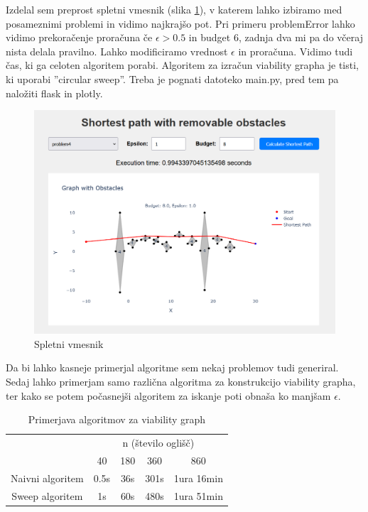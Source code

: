 \documentclass{article}
\begin{document}
Izdelal sem preprost spletni vmesnik (slika \ref{fig:web}), v katerem lahko izbiramo med posameznimi problemi in vidimo najkrajšo pot. Pri primeru problemError lahko vidimo prekoračenje proračuna če $\epsilon > 0.5$ in budget $6$, zadnja dva mi pa do včeraj nista delala pravilno. Lahko modificiramo vrednost $\epsilon$ in proračuna. Vidimo tudi čas, ki ga celoten algoritem porabi. Algoritem za izračun viability grapha je tisti, ki uporabi ''circular sweep''. Treba je pognati datoteko main.py, pred tem pa naložiti flask in plotly.

\begin{figure}[ht]
    \centering
    \includegraphics[width=1\textwidth]{web.png}
    \caption{Spletni vmesnik}
    \label{fig:web}
\end{figure}

Da bi lahko kasneje primerjal algoritme sem nekaj problemov tudi generiral. Sedaj lahko primerjam samo različna algoritma za konstrukcijo viability grapha, ter kako se potem počasnejši algoritem za iskanje poti obnaša ko manjšam $\epsilon$.

\begin{table}[h]
    \centering
    \begin{tabular}{|c|c|c|c|c|}
        \hline
        & \multicolumn{4}{c|}{n (število oglišč)} \\
        \cline{2-5}
        & 40 & 180 & 360 & 860 \\
        \hline
        Naivni algoritem & 0.5s & 36s &  301s &  1ura 16min\\
        \hline
        Sweep algoritem & 1s & 60s & 480s  & 1ura 51min \\
        \hline
    \end{tabular}
    \caption{Primerjava algoritmov za viability graph}
    \label{tab:1}
\end{table}
\end{document}
